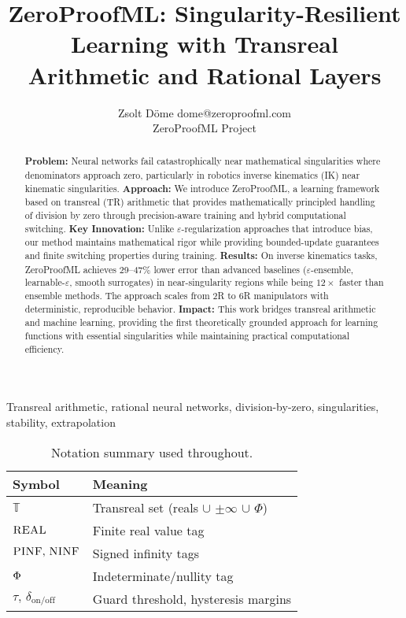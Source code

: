 \documentclass[twoside,11pt]{article}
\newcommand{\TR}{\mathbb{T}}
\newcommand{\trReal}{\textsc{REAL}}
\newcommand{\trPINF}{\textsc{PINF}}
\newcommand{\trNINF}{\textsc{NINF}}
\newcommand{\trPHI}{\textsc{$\Phi$}}
\newcommand{\TAGREAL}{\trReal}
\newcommand{\TAGPINF}{\trPINF}
\newcommand{\TAGNINF}{\trNINF}
\newcommand{\TAGPHI}{\trPHI}
\begin{document}
\title{ZeroProofML: Singularity-Resilient Learning with Transreal Arithmetic and Rational Layers}

\author{
       \name Zsolt D{\"o}me \email dome@zeroproofml.com \\
       \addr ZeroProofML Project
}

\editor{}

\maketitle

\begin{abstract}
\textbf{Problem:} Neural networks fail catastrophically near mathematical singularities where denominators approach zero, particularly in robotics inverse kinematics (IK) near kinematic singularities.
\textbf{Approach:} We introduce ZeroProofML, a learning framework based on transreal (TR) arithmetic that provides mathematically principled handling of division by zero through precision-aware training and hybrid computational switching.
\textbf{Key Innovation:} Unlike $\varepsilon$-regularization approaches that introduce bias, our method maintains mathematical rigor while providing bounded-update guarantees and finite switching properties during training.
\textbf{Results:} On inverse kinematics tasks, ZeroProofML achieves 29--47\% lower error than advanced baselines ($\varepsilon$-ensemble, learnable-$\varepsilon$, smooth surrogates) in near-singularity regions while being $12\times$ faster than ensemble methods. The approach scales from 2R to 6R manipulators with deterministic, reproducible behavior.
\textbf{Impact:} This work bridges transreal arithmetic and machine learning, providing the first theoretically grounded approach for learning functions with essential singularities while maintaining practical computational efficiency.
\end{abstract}

\begin{keywords}
Transreal arithmetic, rational neural networks, division-by-zero, singularities, stability, extrapolation
\end{keywords}

\begin{table}[t]
\centering\small
\begin{tabular}{ll}
\toprule
Symbol & Meaning \\
\midrule
$\TR$ & Transreal set (reals $\cup$ $\pm\infty$ $\cup$ $\Phi$) \\
$\TAGREAL$ & Finite real value tag \\
$\TAGPINF,\,\TAGNINF$ & Signed infinity tags \\
$\TAGPHI$ & Indeterminate/nullity tag \\
$\tau,\,\delta_{\mathrm{on/off}}$ & Guard threshold, hysteresis margins \\
\bottomrule
\end{tabular}
\caption{Notation summary used throughout.}
\label{tab:notation}
\end{table}
\end{document}
